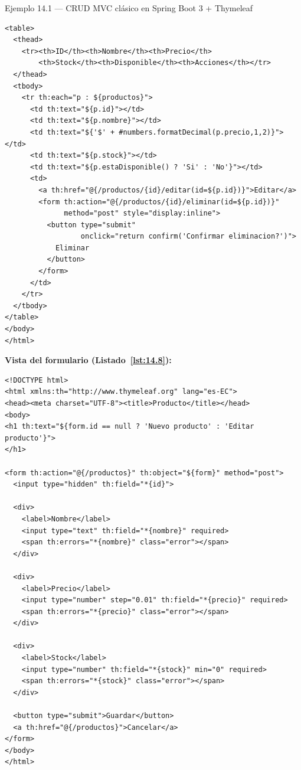 \documentclass[11pt,a4paper,openany]{book}
\begin{document}
\begin{cajaejemplo}{Ejemplo 14.1 --- CRUD MVC clásico en Spring Boot 3 + Thymeleaf}
\begin{lstlisting}[style=html,caption={templates/productos/lista.html},label=lst:14.7]
<table>
  <thead>
    <tr><th>ID</th><th>Nombre</th><th>Precio</th>
        <th>Stock</th><th>Disponible</th><th>Acciones</th></tr>
  </thead>
  <tbody>
    <tr th:each="p : ${productos}">
      <td th:text="${p.id}"></td>
      <td th:text="${p.nombre}"></td>
      <td th:text="${'$' + #numbers.formatDecimal(p.precio,1,2)}"></td>
      <td th:text="${p.stock}"></td>
      <td th:text="${p.estaDisponible() ? 'Si' : 'No'}"></td>
      <td>
        <a th:href="@{/productos/{id}/editar(id=${p.id})}">Editar</a>
        <form th:action="@{/productos/{id}/eliminar(id=${p.id})}"
              method="post" style="display:inline">
          <button type="submit"
                  onclick="return confirm('Confirmar eliminacion?')">
            Eliminar
          </button>
        </form>
      </td>
    </tr>
  </tbody>
</table>
</body>
</html>
\end{lstlisting}

\textbf{Vista del formulario (Listado~\ref{lst:14.8}):}
\begin{lstlisting}[style=html,caption={templates/productos/formulario.html},label=lst:14.8]
<!DOCTYPE html>
<html xmlns:th="http://www.thymeleaf.org" lang="es-EC">
<head><meta charset="UTF-8"><title>Producto</title></head>
<body>
<h1 th:text="${form.id == null ? 'Nuevo producto' : 'Editar producto'}">
</h1>

<form th:action="@{/productos}" th:object="${form}" method="post">
  <input type="hidden" th:field="*{id}">

  <div>
    <label>Nombre</label>
    <input type="text" th:field="*{nombre}" required>
    <span th:errors="*{nombre}" class="error"></span>
  </div>

  <div>
    <label>Precio</label>
    <input type="number" step="0.01" th:field="*{precio}" required>
    <span th:errors="*{precio}" class="error"></span>
  </div>

  <div>
    <label>Stock</label>
    <input type="number" th:field="*{stock}" min="0" required>
    <span th:errors="*{stock}" class="error"></span>
  </div>

  <button type="submit">Guardar</button>
  <a th:href="@{/productos}">Cancelar</a>
</form>
</body>
</html>
\end{lstlisting}


\end{cajaejemplo}
\end{document}
